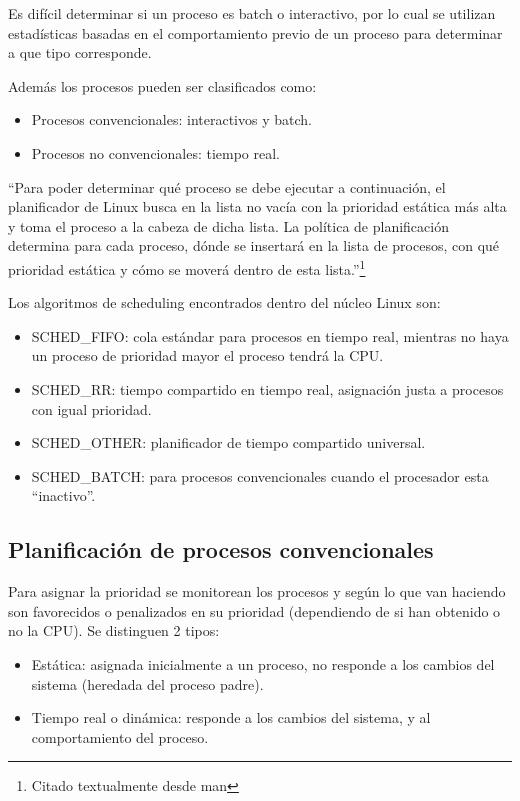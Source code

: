 Es difícil determinar si un proceso es batch o interactivo, por lo cual se
utilizan estadísticas basadas en el comportamiento previo de un proceso para
determinar a que tipo corresponde.

Además los procesos pueden ser clasificados como:

\begin{itemize}
\item Procesos convencionales: interactivos y batch.
\item Procesos no convencionales: tiempo real.
\end{itemize}

``Para poder determinar qué proceso se debe ejecutar a continuación, el
planificador de Linux  busca  en  la lista  no  vacía  con  la prioridad
estática más alta y toma el proceso a la cabeza de dicha lista. La política de
planificación determina para cada proceso, dónde se insertará en la lista de
procesos, con qué prioridad estática y cómo se moverá dentro de esta
lista.''\footnote{Citado textualmente desde man}

Los algoritmos de scheduling encontrados dentro del núcleo Linux son:
\begin{itemize}
\item SCHED\_FIFO: cola estándar para procesos en tiempo real, mientras no haya
un proceso de prioridad mayor el proceso tendrá la CPU.
\item SCHED\_RR: tiempo compartido en tiempo real, asignación justa a procesos
con igual prioridad.
\item SCHED\_OTHER: planificador de tiempo compartido universal.
\item SCHED\_BATCH: para procesos convencionales cuando el procesador esta
``inactivo''.
\end{itemize}

\subsection{Planificación de procesos convencionales}
Para asignar la prioridad se monitorean los procesos y según lo que van haciendo
son favorecidos o penalizados en su prioridad (dependiendo de si han obtenido o
no la CPU). Se distinguen 2 tipos:

\begin{itemize}
\item Estática: asignada inicialmente a un proceso, no responde a los cambios
del sistema (heredada del proceso padre).
\item Tiempo real o dinámica: responde a los cambios del sistema, y al
comportamiento del proceso.
\end{itemize}

